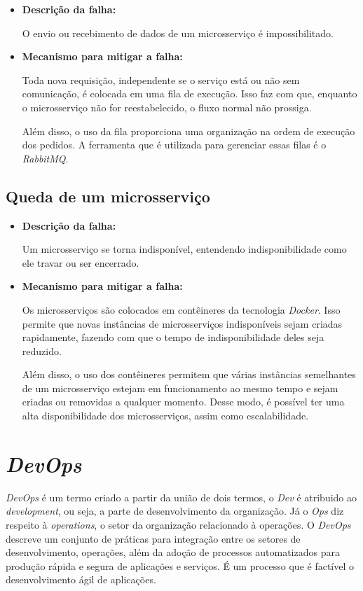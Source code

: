 \begin{itemize}
    \item \textbf{Descrição da falha:}

     O envio ou recebimento de dados de um microsserviço é impossibilitado.

    \item \textbf{Mecanismo para mitigar a falha:}

    Toda nova requisição, independente se o serviço está ou não sem comunicação, é colocada em uma fila de execução. Isso faz com que, enquanto o microsserviço não for reestabelecido, o fluxo normal não prossiga.

    Além disso, o uso da fila proporciona uma organização na ordem de execução dos pedidos. A ferramenta que é utilizada para gerenciar essas filas é o \textit{RabbitMQ}.
\end{itemize}

\subsection{Queda de um microsserviço}

\begin{itemize}
    \item \textbf{Descrição da falha:}

    Um microsserviço se torna indisponível, entendendo indisponibilidade como ele travar ou ser encerrado.

    \item \textbf{Mecanismo para mitigar a falha:}

    Os microsserviços são colocados em contêineres da tecnologia \textit{Docker}. Isso permite que novas instâncias de microsserviços indisponíveis sejam criadas rapidamente, fazendo com que o tempo de indisponibilidade deles seja reduzido.

    Além disso, o uso dos contêineres permitem que várias instâncias semelhantes de um microsserviço estejam em funcionamento ao mesmo tempo e sejam criadas ou removidas a qualquer momento. Desse modo, é possível ter uma alta disponibilidade dos microsserviços, assim como escalabilidade.
\end{itemize}

\section{\textit{DevOps}}

\textit{DevOps} é um termo criado a partir da união de dois termos, o \textit{Dev} é atribuido ao \textit{development}, ou seja, a parte de desenvolvimento da organização. Já o \textit{Ops} diz respeito à \textit{operations}, o setor da organização relacionado à operações. O \textit{DevOps} descreve um conjunto de práticas para integração entre os setores de desenvolvimento, operações, além da adoção de processos automatizados para produção rápida e segura de aplicações e serviços. É um processo que é factível o desenvolvimento ágil de aplicações.

